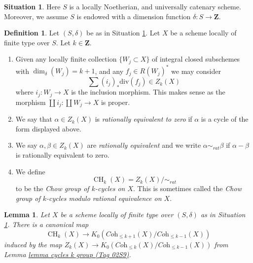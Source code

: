 \documentclass{amsart}
\theoremstyle{plain}
\newtheorem{lemma}[subsection]{Lemma}
\theoremstyle{definition}
\newtheorem{definition}[subsection]{Definition}
\newtheorem{situation}[subsection]{Situation}
\theoremstyle{remark}
\numberwithin{equation}{subsection}
\def\CH{\mathop{\mathrm{CH}}\nolimits}
\begin{document}
\begin{situation}
\label{situation-setup}
Here $S$ is a locally Noetherian, and universally catenary scheme.
Moreover, we assume $S$ is endowed with a dimension function
$\delta : S \longrightarrow \mathbf{Z}$.
\end{situation}

\begin{definition}
\label{definition-rational-equivalence}
Let $(S, \delta)$ be as in Situation \ref{situation-setup}.
Let $X$ be a scheme locally of finite type over $S$.
Let $k \in \mathbf{Z}$.
\begin{enumerate}
\item Given any locally finite collection $\{W_j \subset X\}$
of integral closed subschemes with $\dim_\delta(W_j) = k + 1$,
and any $f_j \in R(W_j)^*$ we may consider
$$
\sum (i_j)_*\text{div}(f_j) \in Z_k(X)
$$
where $i_j : W_j \to X$ is the inclusion morphism.
This makes sense as the morphism
$\coprod i_j : \coprod W_j \to X$ is proper.
\item We say that $\alpha \in Z_k(X)$ is {\it rationally equivalent to zero}
if $\alpha$ is a cycle of the form displayed above.
\item We say $\alpha, \beta \in Z_k(X)$ are
{\it rationally equivalent} and we write $\alpha \sim_{rat} \beta$
if $\alpha - \beta$ is rationally equivalent to zero.
\item We define
$$
\CH_k(X) = Z_k(X) / \sim_{rat}
$$
to be the {\it Chow group of $k$-cycles on $X$}. This is sometimes called
the {\it Chow group of $k$-cycles modulo rational equivalence on $X$}.
\end{enumerate}
\end{definition}

\begin{lemma}
\label{lemma-from-chow-to-K}
Let $X$ be a scheme locally of finite type over $(S, \delta)$
as in Situation \ref{situation-setup}. There is a canonical map
$$
\CH_k(X)
\longrightarrow
K_0(\textit{Coh}_{\leq k + 1}(X)/\textit{Coh}_{\leq k - 1}(X))
$$
induced by the map
$Z_k(X) \to K_0(\textit{Coh}_{\leq k}(X)/\textit{Coh}_{\leq k - 1}(X))$
from Lemma \href{https://stacks.math.columbia.edu/tag/02S9}{lemma cycles k group (Tag 02S9)}.
\end{lemma}
\end{document}
